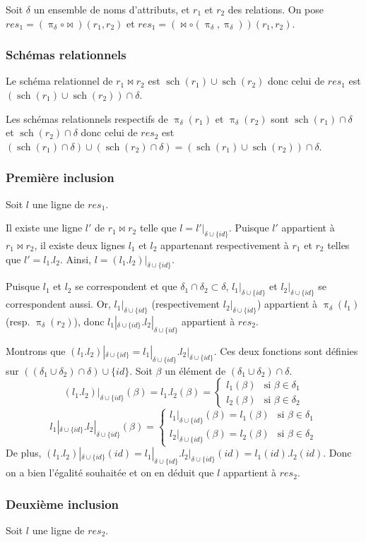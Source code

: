 \documentclass[french]{article}
\DeclareMathOperator{\proj}{\pi}
\DeclareMathOperator{\s}{sch}
\newcommand{\projDelta}{\proj_{\delta}}
\newcommand{\cip}{\cup \{id\}}
\newcommand{\dilta}{{\delta \cip}}
\begin{document}
Soit $\delta$ un ensemble de noms d'attributs,
et $r_1$ et $r_2$ des relations.
On pose $res_1 = (\projDelta \circ \Join)(r_1, r_2)$
et $res_1 = (\Join \circ (\projDelta, \projDelta))(r_1, r_2)$.

\subsubsection*{Schémas relationnels}
Le schéma relationnel de $r_1 \Join r_2$ est
$\s(r_1) \cup \s(r_2)$ donc celui de $res_1$
est $(\s(r_1) \cup \s(r_2)) \cap \delta$.

Les schémas relationnels respectifs de 
$\projDelta(r_1)$ et $\projDelta(r_2)$
sont $\s(r_1) \cap \delta$ et $\s(r_2)\cap \delta$
donc celui de $res_2$ est 
$(\s(r_1)\cap \delta) \cup (\s(r_2)\cap\delta) = (\s(r_1)\cup\s(r_2)) \cap \delta$.

\subsubsection*{Première inclusion}
Soit $l$ une ligne de $res_1$.

Il existe une ligne $l'$ de $r_1 \Join r_2$
telle que $l = l'|_\dilta$.
Puisque $l'$ appartient à $r_1 \Join r_2$,
il existe deux lignes $l_1$ et $l_2$ appartenant
respectivement à $r_1$ et $r_2$ telles que
$l' = l_1.l_2$.
Ainsi, $l = (l_1.l_2)|_\dilta$.

Puisque $l_1$ et $l_2$ se correspondent
et que $\delta_1 \cap \delta_2 \subset \delta$,
$l_1|_\dilta$ et $l_2|_\dilta$ se correspondent aussi.
Or, $l_1|_\dilta$ (respectivement $l_2|_\dilta$)
appartient à $\projDelta(l_1)$ (resp. $\projDelta(r_2)$),
donc $l_1|_\dilta . l_2|_\dilta$ appartient
à $res_2$.

Montrons que $(l_1.l_2)|_\dilta = l_1|_\dilta . l_2|_\dilta$.
Ces deux fonctions sont définies sur $((\delta_1 \cup \delta_2) \cap \delta) \cip$.
Soit $\beta$ un élément de $(\delta_1 \cup \delta_2) \cap \delta$.
$$
(l_1.l_2)|_\dilta(\beta) = l_1.l_2(\beta) =
\left\lbrace
\begin{array}{ll}
l_1(\beta) & \text{si $\beta \in \delta_1$} \\
l_2(\beta) & \text{si $\beta \in \delta_2$}
\end{array}
\right.
$$
$$
l_1|_\dilta . l_2|_\dilta (\beta) = 
\left\lbrace
\begin{array}{ll}
l_1|_\dilta (\beta) = l_1(\beta) & \text{si $\beta \in \delta_1$} \\
l_2|_\dilta (\beta) = l_2(\beta) & \text{si $\beta \in \delta_2$}
\end{array}
\right.
$$
De plus, $(l_1.l_2)|_\dilta(id) = l_1|_\dilta . l_2|_\dilta (id) = l_1(id) . l_2(id)$.
Donc on a bien l'égalité souhaitée et on en déduit que $l$ appartient à $res_2$.

\subsubsection*{Deuxième inclusion}
Soit $l$ une ligne de $res_2$.
\end{document}

